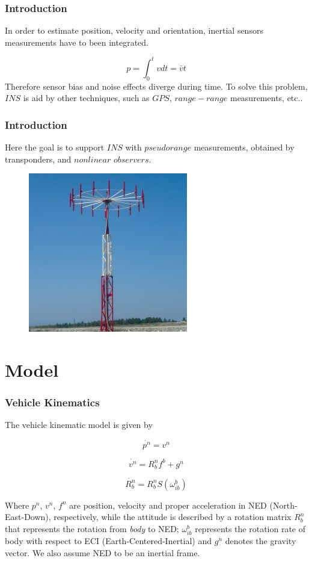 \documentclass{beamer}
\begin{document}
	\begin{frame}
		\frametitle{Introduction}
		In order to estimate position, velocity and orientation, inertial sensors measurements have to been integrated.
		
		\[ p =  \int_0^t{v dt} = \bar{v}t \]
		\vspace{0.2cm}
		Therefore sensor bias and noise effects diverge during time.
		\vspace{0.2cm}
		To solve this problem, $INS$ is aid by other techniques, such as $GPS$, $range-range$ measurements, etc..\\
	\end{frame}

	\begin{frame}
		\frametitle{Introduction}
		Here the goal is to support $INS$ with $pseudorange$ measurements, obtained by transponders, and $nonlinear$ $observers$. 
		
		\begin{figure}[H]
			\includegraphics[scale=0.4]{transp}
		\end{figure}
	\end{frame}
\section{Model}
	\begin{frame}
	\frametitle{Vehicle Kinematics}
	The vehicle kinematic model is given by
	
	\[ \dot{p^n} = v^n \]
	
	\[ \dot{v^n} = R^n_b f^b + g^n\]
	
	\[ \dot{R^n_b} = R^n_bS(\omega^b_{ib}) \]
	
	Where $p^n$, $v^n$, $f^n$ are position, velocity and proper acceleration in NED (North-East-Down), respectively, while the attitude is described by a rotation matrix $R^n_b$ that represents the rotation from \textit{body} to NED; $\omega^b_{ib}$ represents the rotation rate of body with respect to ECI (Earth-Centered-Inertial) and $g^n$ denotes the gravity vector. We also assume NED to be an inertial frame. 
	
	\end{frame}
	
\end{document}
